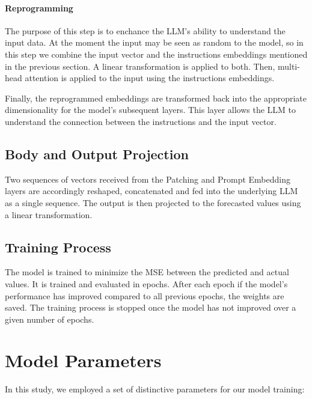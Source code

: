 \paragraph{Reprogramming}
The purpose of this step is to enchance the LLM's ability to understand the input data. At the moment the input may be seen as random to the model, so in this step we combine the input vector and the instructions embeddings mentioned in the previous section. A linear transformation is applied to both. Then, multi-head attention is applied to the input using the instructions embeddings.

Finally, the reprogrammed embeddings are transformed back into the appropriate dimensionality for the model's subsequent layers. This layer allows the LLM to understand the connection between the instructions and the input vector.

\subsection{Body and Output Projection}
Two sequences of vectors received from the Patching and Prompt Embedding layers are accordingly reshaped, concatenated and fed into the underlying LLM as a single sequence. The output is then projected to the forecasted values using a linear transformation.


\subsection{Training Process}

The model is trained to minimize the MSE between the predicted and actual values. It is trained and evaluated in epochs. After each epoch if the model's performance has improved compared to all previous epochs, the weights are saved. The training process is stopped once the model has not improved over a given number of epochs.

\section{Model Parameters}
In this study, we employed a set of distinctive parameters for our model training:

